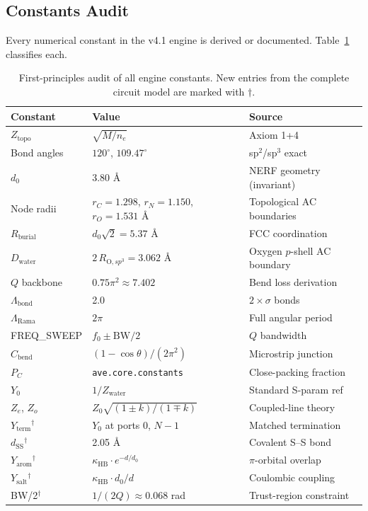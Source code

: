 \subsection{Constants Audit}

Every numerical constant in the v4.1 engine is derived or documented.
Table~\ref{tab:constants_audit} classifies each.

\begin{table}[H]
\centering
\caption{First-principles audit of all engine constants.
New entries from the complete circuit model are marked with $\dagger$.}
\label{tab:constants_audit}
\begin{tabular}{l l l}
\toprule
Constant & Value & Source \\
\midrule
$Z_\text{topo}$ & $\sqrt{M/n_e}$ & Axiom 1+4 \\
Bond angles & $120^\circ$, $109.47^\circ$ & sp$^2$/sp$^3$ exact \\
$d_0$ & 3.80 \AA & NERF geometry (invariant) \\
Node radii & $r_C=1.298$, $r_N=1.150$, $r_O=1.531$ \AA & Topological AC boundaries \\
$R_\text{burial}$ & $d_0\sqrt{2} = 5.37$ \AA & FCC coordination \\
$D_\text{water}$ & $2\,R_{\text{O},sp^3} = 3.062$ \AA & Oxygen $p$-shell AC boundary \\
$Q$ backbone & $0.75\pi^2 \approx 7.402$ & Bend loss derivation \\
$\Lambda_\text{bond}$ & 2.0 & $2\times\sigma$ bonds \\
$\Lambda_\text{Rama}$ & $2\pi$ & Full angular period \\
FREQ\_SWEEP & $f_0 \pm \text{BW}/2$ & $Q$ bandwidth \\
$C_\text{bend}$ & $(1{-}\cos\theta)/(2\pi^2)$ & Microstrip junction \\
$P_C$ & \texttt{ave.core.constants} & Close-packing fraction \\
$Y_0$ & $1/Z_\text{water}$ & Standard S-param ref \\
$Z_e$, $Z_o$ & $Z_0\sqrt{(1\pm k)/(1\mp k)}$ & Coupled-line theory \\
\midrule
$Y_\text{term}$$^\dagger$ & $Y_0$ at ports 0, $N{-}1$ & Matched termination \\
$d_\text{SS}$$^\dagger$ & 2.05 \AA & Covalent S--S bond \\
$Y_\text{arom}$$^\dagger$ & $\kappa_\text{HB} \cdot e^{-d/d_0}$ & $\pi$-orbital overlap \\
$Y_\text{salt}$$^\dagger$ & $\kappa_\text{HB} \cdot d_0/d$ & Coulombic coupling \\
BW/2$^\dagger$ & $1/(2Q) \approx 0.068$ rad & Trust-region constraint \\
\bottomrule
\end{tabular}
\end{table}

